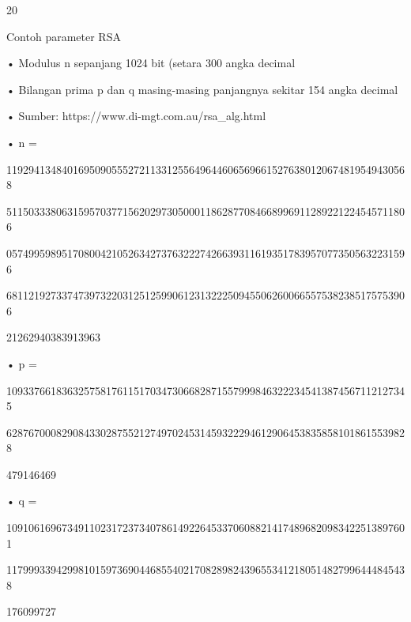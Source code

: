 \documentclass{article}
\begin{document}

20

Contoh parameter RSA 

• Modulus n sepanjang 1024 bit (setara 300 angka decimal

• Bilangan prima p dan q masing-masing panjangnya sekitar  154 angka decimal

• Sumber:  https://www.di-mgt.com.au/rsa\_alg.html

• n = 

1192941348401695090555272113312556496446065696615276380120674819549430568

5115033380631595703771562029730500011862877084668996911289221224545711806

0574995989517080042105263427376322274266393116193517839570773505632231596

6811219273374739732203125125990612313222509455062600665575382385175753906

21262940383913963

• p = 

1093376618363257581761151703473066828715579998463222345413874567112127345

6287670008290843302875521274970245314593222946129064538358581018615539828

479146469

• q = 

1091061696734911023172373407861492264533706088214174896820983422513897601

1179993394299810159736904468554021708289824396553412180514827996444845438

176099727
\end{document}
